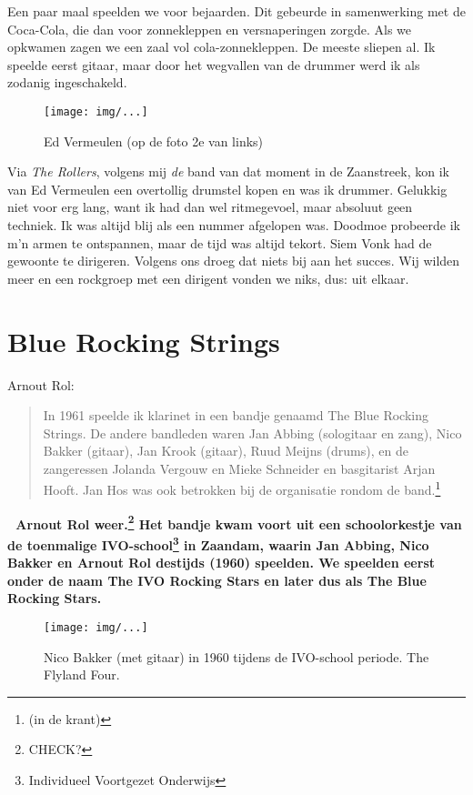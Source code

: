\documentclass[10pt,twoside,openright]{memoir}
\begin{document}
Een paar maal speelden we voor bejaarden. Dit gebeurde in samenwerking met de Coca-Cola, die dan voor zonnekleppen en versnaperingen zorgde. Als we opkwamen zagen we een zaal vol cola-zonnekleppen. De meeste sliepen al. Ik speelde eerst gitaar, maar door het wegvallen van de drummer werd ik als zodanig ingeschakeld. 

\begin{figure}[t]
\texttt{[image: img/...]}
\caption{Ed Vermeulen (op de foto 2e van links)}
\end{figure}

Via \emph{The Rollers}, volgens mij \emph{de} band van dat moment in de Zaanstreek, kon ik van Ed Vermeulen een overtollig drumstel kopen en was ik drummer. Gelukkig niet voor erg lang, want ik had dan wel ritmegevoel, maar absoluut geen techniek. Ik was altijd blij als een nummer afgelopen was. Doodmoe probeerde ik m'n armen te ontspannen, maar de tijd was altijd tekort. Siem Vonk had de gewoonte te dirigeren. Volgens ons droeg dat niets bij aan het succes. Wij wilden meer en een rockgroep met een dirigent vonden we niks, dus: uit elkaar. 

\chapter{Blue Rocking Strings} %
\label{cha:bluerocking}

Arnout Rol:

\begin{quote}
In 1961 speelde ik klarinet in een bandje genaamd The Blue Rocking Strings. De andere bandleden waren Jan Abbing (sologitaar en zang), Nico Bakker (gitaar), Jan Krook (gitaar), Ruud Meijns (drums), en de zangeressen Jolanda Vergouw en Mieke Schneider en basgitarist Arjan Hooft. Jan Hos was ook betrokken bij de organisatie rondom de band.\footnote{(in de krant)}
\end{quote}
 
\bf{Arnout Rol weer.}\footnote{CHECK?} Het bandje kwam voort uit een schoolorkestje van de toenmalige IVO-school\footnote{Individueel Voortgezet Onderwijs} in Zaandam, waarin Jan Abbing, Nico Bakker en Arnout Rol destijds (1960) speelden. We speelden eerst onder de naam The IVO Rocking Stars en later dus als The Blue Rocking Stars. 

\begin{figure}[t]
\texttt{[image: img/...]}
\caption{Nico Bakker (met gitaar) in 1960 tijdens de IVO-school periode. The Flyland Four.}
\end{figure}	
\end{document}
